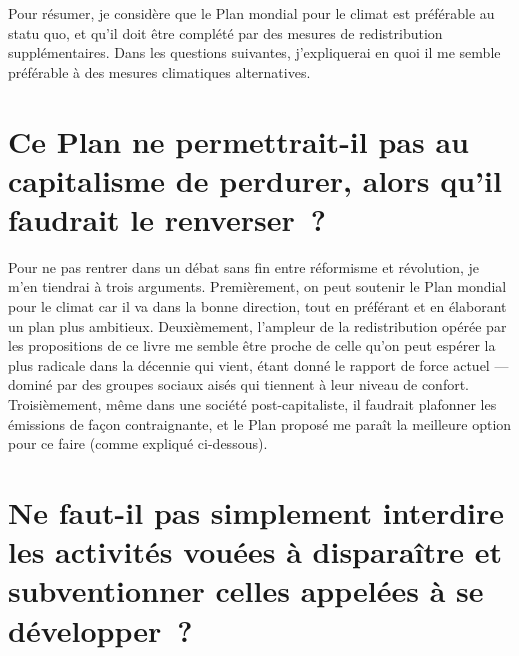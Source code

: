 \documentclass[a5paper,french,openany]{memoir}
\begin{document}
Pour résumer, je considère que le Plan mondial pour le climat est préférable au statu quo, et qu'il doit être complété par des mesures de redistribution supplémentaires. Dans les questions suivantes, j'expliquerai en quoi il me semble préférable à des mesures climatiques alternatives. 


\section*{\normalsize Ce Plan ne permettrait-il pas au capitalisme de perdurer, alors qu'il faudrait le renverser~?}\label{q:capitalisme}

Pour ne pas rentrer dans un débat sans fin entre réformisme et révolution, je m'en tiendrai à trois arguments. Premièrement, on peut soutenir le Plan mondial pour le climat car il va dans la bonne direction, tout en préférant et en élaborant un plan plus ambitieux. Deuxièmement, l'ampleur de la redistribution opérée par les propositions de ce livre me semble être proche de celle qu'on peut espérer la plus radicale %
dans la décennie qui vient, étant donné le rapport de force actuel --- dominé par des groupes sociaux aisés qui tiennent à leur niveau de confort. %
Troisièmement, même dans une société post-capitaliste, il faudrait plafonner les émissions de façon contraignante, et le Plan proposé me paraît la meilleure option pour ce faire (comme expliqué ci-dessous). 

\section*{\normalsize Ne faut-il pas simplement %
interdire les activités vouées à disparaître et subventionner celles appelées à se développer~?}\label{q:interdiction}
\end{document}

